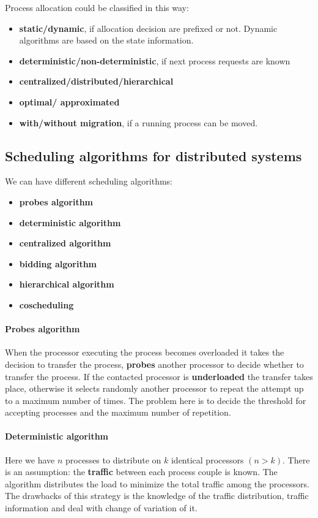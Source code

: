 Process allocation could be classified in this way:
\begin{itemize}
	\item \textbf{static/dynamic}, if allocation decision are prefixed or not. Dynamic algorithms are based on the state information.
	\item\textbf{ deterministic/non-deterministic}, if next process requests are known 
	\item \textbf{centralized/distributed/hierarchical}
	\item \textbf{optimal/ approximated}
	\item \textbf{with/without migration}, if a running process can be moved. 
\end{itemize}



\subsection{Scheduling algorithms for distributed systems}
We can have different scheduling algorithms:
\begin{itemize}
	\item \textbf{probes algorithm } 
	\item \textbf{deterministic algorithm } 
	\item \textbf{centralized algorithm } 
	\item \textbf{bidding  algorithm} 
	\item \textbf{hierarchical algorithm } 
	\item \textbf{coscheduling}
\end{itemize}

\paragraph{Probes algorithm} When the processor executing the process becomes overloaded it takes the decision to transfer the process, \textbf{probes} another processor to decide whether to transfer the process. If the contacted processor is \textbf{underloaded} the transfer takes place, otherwise it selects randomly another processor to repeat the attempt up to a maximum number of times. The problem here is to decide the threshold for accepting processes and the maximum number of repetition. 

\paragraph{Deterministic algorithm}
Here we have $n$ processes to distribute on $k$ identical processors $(n > k)$. There is an assumption: the \textbf{traffic} between each process couple is known. The algorithm distributes the load to minimize the total traffic among the processors. The drawbacks of this strategy is the knowledge of the traffic distribution, traffic information and deal with change of variation of it.

